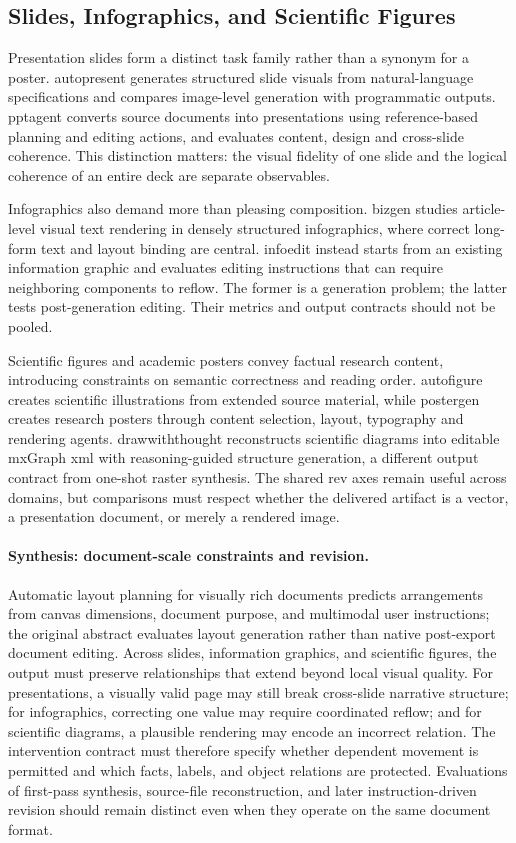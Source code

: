 \subsection{Slides, Infographics, and Scientific Figures}
Presentation slides form a distinct task family rather than a synonym for a poster.
\ac{autopresent} generates structured slide visuals from natural-language specifications and compares image-level generation with programmatic outputs.
\ac{pptagent} converts source documents into presentations using reference-based planning and editing actions, and evaluates content, design and cross-slide coherence.
This distinction matters: the visual fidelity of one slide and the logical coherence of an entire deck are separate observables.

Infographics also demand more than pleasing composition.
\ac{bizgen} studies article-level visual text rendering in densely structured infographics, where correct long-form text and layout binding are central.
\ac{infoedit} instead starts from an existing information graphic and evaluates editing instructions that can require neighboring components to reflow.
The former is a generation problem; the latter tests post-generation editing.
Their metrics and output contracts should not be pooled.

Scientific figures and academic posters convey factual research content, introducing constraints on semantic correctness and reading order.
\ac{autofigure} creates scientific illustrations from extended source material, while \ac{postergen} creates research posters through content selection, layout, typography and rendering agents.
\ac{drawwiththought} reconstructs scientific diagrams into editable mxGraph \ac{xml} with reasoning-guided structure generation, a different output contract from one-shot raster synthesis.
The shared \ac{rev} axes remain useful across domains, but comparisons must respect whether the delivered artifact is a vector, a presentation document, or merely a rendered image.

\paragraph{Synthesis: document-scale constraints and revision.}
Automatic layout planning for visually rich documents \citep{zhu2024visuallyrichplanning} predicts arrangements from canvas dimensions, document purpose, and multimodal user instructions; the original abstract evaluates layout generation rather than native post-export document editing.
Across slides, information graphics, and scientific figures, the output must preserve relationships that extend beyond local visual quality.
For presentations, a visually valid page may still break cross-slide narrative structure; for infographics, correcting one value may require coordinated reflow; and for scientific diagrams, a plausible rendering may encode an incorrect relation.
The intervention contract must therefore specify whether dependent movement is permitted and which facts, labels, and object relations are protected.
Evaluations of first-pass synthesis, source-file reconstruction, and later instruction-driven revision should remain distinct even when they operate on the same document format.

